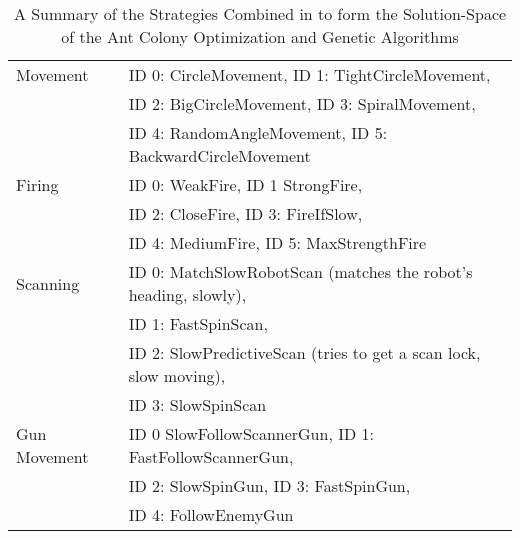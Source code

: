 \begin{table*}
\centering
\begin{tabular}{|l|l|}
\hline
Movement & ID 0: CircleMovement, ID 1: TightCircleMovement, \\ &  ID 2: BigCircleMovement,
ID 3: SpiralMovement, \\ & ID 4: RandomAngleMovement, ID 5: BackwardCircleMovement \\
\hline
Firing & ID 0: WeakFire, ID 1 StrongFire, \\ &  ID 2: CloseFire, ID 3: FireIfSlow, \\ & ID 4: MediumFire, ID 5: MaxStrengthFire \\
\hline
Scanning & ID 0: MatchSlowRobotScan (matches the robot's heading, slowly),\\ &  ID 1: FastSpinScan, \\ & ID 2: SlowPredictiveScan (tries to get a scan lock, slow moving), \\ &  ID 3: SlowSpinScan \\
\hline
Gun Movement & ID 0 SlowFollowScannerGun, ID 1: FastFollowScannerGun, \\ & 
 ID 2: SlowSpinGun, ID 3: FastSpinGun, \\ &  ID 4: FollowEnemyGun \\
\hline
\end{tabular}
\caption{A Summary of the Strategies Combined in to form the Solution-Space of the Ant Colony Optimization and Genetic Algorithms}
\label{table:strategies}
\end{table*}



